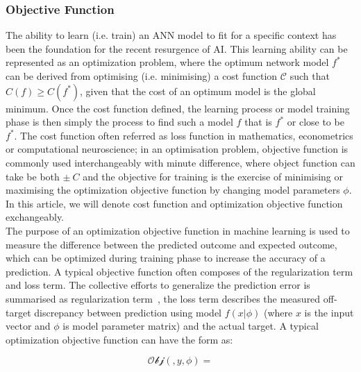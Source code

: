 \subsubsection{Objective Function}
The ability to learn (i.e. train) an ANN model to fit for a specific context has been the foundation for the recent resurgence of AI. This learning ability can be represented as an optimization problem, where the optimum network model $f^*$ can be derived from optimising (i.e. minimising) a cost function $\mathcal{C}$ such that $C(f) \geq C(f^*)$, given that the cost of an optimum model is the global minimum. Once the cost function defined, the learning process or model training phase is then simply the process to find such a model $f$ that is $f^*$ or close to be $f^*$. The cost function often referred as loss function in mathematics, econometrics or computational neuroscience; in an optimisation problem, objective function is commonly used interchangeably with minute difference, where object function can take be both $\pm~C$ and the objective for training is the exercise of minimising or maximising the optimization objective function by changing model parameters $\phi$. In this article, we will denote cost function and optimization objective function exchangeably.
\\
The purpose of an optimization objective function in machine learning is used to measure the difference between the predicted outcome and expected outcome, which can be optimized during training phase to increase the accuracy of a prediction. A typical objective function often composes of the regularization term and loss term. The collective efforts to generalize the prediction error is summarised as regularization term~\cite{goodfellow_2015}, the loss term describes the measured off-target discrepancy between prediction using model $f(x|\phi)$ (where $x$ is the input vector and $\phi$ is model parameter matrix) and the actual target. A typical optimization objective function can have the form as:

\begin{equation}
    \mathcal{Obj}(,y,\phi) = 
\end{equation}